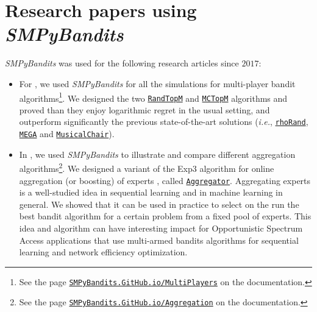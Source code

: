 \documentclass[a4paper,10pt,]{article}
\providecommand{\tightlist}{%
  \setlength{\itemsep}{0pt}\setlength{\parskip}{0pt}}
\begin{document}

\section{\texorpdfstring{Research papers using \emph{SMPyBandits}}{Research using SMPyBandits}}\label{research-using-smpybandits}

\emph{SMPyBandits} was used for the following research articles since
\(2017\):

\begin{itemize}
\tightlist
\item
  For \citet{BessonALT2018}, we used \emph{SMPyBandits} for all the
  simulations for multi-player bandit algorithms\footnote{See
    the page
    \href{https://SMPyBandits.GitHub.io/MultiPlayers.html}{\texttt{SMPyBandits.GitHub.io/MultiPlayers}}
    on the documentation.}. We designed the two
  \href{https://SMPyBandits.GitHub.io/docs/PoliciesMultiPlayers.RandTopM.html}{\texttt{RandTopM}}
  and
  \href{https://SMPyBandits.GitHub.io/docs/PoliciesMultiPlayers.MCTopM.html}{\texttt{MCTopM}}
  algorithms and proved than they enjoy logarithmic regret in the usual
  setting, and outperform significantly the previous state-of-the-art
  solutions (\emph{i.e.},
  \href{https://SMPyBandits.GitHub.io/docs/PoliciesMultiPlayers.rhoRand.html}{\texttt{rhoRand}},
  \href{https://SMPyBandits.GitHub.io/docs/Policies.MEGA.html}{\texttt{MEGA}}
  and
  \href{https://SMPyBandits.GitHub.io/docs/Policies.MusicalChair.html}{\texttt{MusicalChair}}).
\end{itemize}

\begin{itemize}
\tightlist
\item
  In \citet{BessonWCNC2018}, we used \emph{SMPyBandits} to illustrate and
  compare different aggregation algorithms\footnote{See the page
    \href{https://SMPyBandits.GitHub.io/Aggregation.html}{\texttt{SMPyBandits.GitHub.io/Aggregation}}
    on the documentation.}. We designed a variant of the Exp3 algorithm
  for online aggregation (or boosting) of experts \citep{Bubeck12}, called
  \href{https://SMPyBandits.GitHub.io/docs/Policies.Aggregator.html}{\texttt{Aggregator}}.
  Aggregating experts is a well-studied idea in sequential learning and
  in machine learning in general. We showed that it can be used in
  practice to select on the run the best bandit algorithm for a certain
  problem from a fixed pool of experts. This idea and algorithm can have
  interesting impact for Opportunistic Spectrum Access applications
  \citep{Jouini09} that use multi-armed bandits algorithms for sequential
  learning and network efficiency optimization.
\end{itemize}
\end{document}
